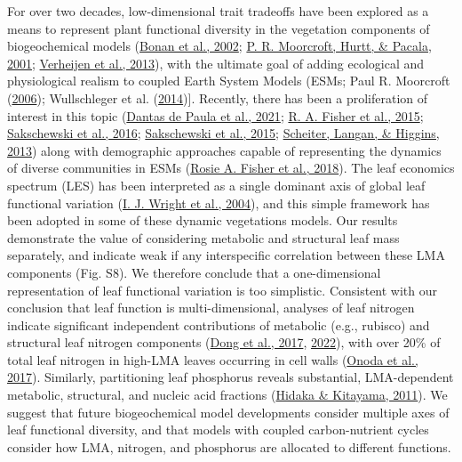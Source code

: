 \documentclass[
  12pt,
  letterpaper,
  DIV=11,
  numbers=noendperiod]{scrartcl}
\begin{document}
For over two decades, low-dimensional trait tradeoffs have been explored
as a means to represent plant functional diversity in the vegetation
components of biogeochemical models
(\protect\hyperlink{ref-Bonan2002}{Bonan et al., 2002};
\protect\hyperlink{ref-Moorcroft2001}{P. R. Moorcroft, Hurtt, \& Pacala,
2001}; \protect\hyperlink{ref-Verheijen2013}{Verheijen et al., 2013}),
with the ultimate goal of adding ecological and physiological realism to
coupled Earth System Models (ESMs; Paul R. Moorcroft
(\protect\hyperlink{ref-Moorcroft2006}{2006}); Wullschleger et al.
(\protect\hyperlink{ref-Wullschleger2014}{2014}){]}. Recently, there has
been a proliferation of interest in this topic
(\protect\hyperlink{ref-DantasdePaula2021}{Dantas de Paula et al.,
2021}; \protect\hyperlink{ref-Fisher2015}{R. A. Fisher et al., 2015};
\protect\hyperlink{ref-Sakschewski2016}{Sakschewski et al., 2016};
\protect\hyperlink{ref-Sakschewski2015}{Sakschewski et al., 2015};
\protect\hyperlink{ref-Scheiter2013}{Scheiter, Langan, \& Higgins,
2013}) along with demographic approaches capable of representing the
dynamics of diverse communities in ESMs
(\protect\hyperlink{ref-Fisher2018}{Rosie A. Fisher et al., 2018}). The
leaf economics spectrum (LES) has been interpreted as a single dominant
axis of global leaf functional variation
(\protect\hyperlink{ref-Wright2004a}{I. J. Wright et al., 2004}), and
this simple framework has been adopted in some of these dynamic
vegetations models. Our results demonstrate the value of considering
metabolic and structural leaf mass separately, and indicate weak if any
interspecific correlation between these LMA components (Fig. S8). We
therefore conclude that a one-dimensional representation of leaf
functional variation is too simplistic. Consistent with our conclusion
that leaf function is multi-dimensional, analyses of leaf nitrogen
indicate significant independent contributions of metabolic (e.g.,
rubisco) and structural leaf nitrogen components
(\protect\hyperlink{ref-Dong2017}{Dong et al., 2017},
\protect\hyperlink{ref-Dong2022a}{2022}), with over 20\% of total leaf
nitrogen in high-LMA leaves occurring in cell walls
(\protect\hyperlink{ref-Onoda2017}{Onoda et al., 2017}). Similarly,
partitioning leaf phosphorus reveals substantial, LMA-dependent
metabolic, structural, and nucleic acid fractions
(\protect\hyperlink{ref-Hidaka2011}{Hidaka \& Kitayama, 2011}). We
suggest that future biogeochemical model developments consider multiple
axes of leaf functional diversity, and that models with coupled
carbon-nutrient cycles consider how LMA, nitrogen, and phosphorus are
allocated to different functions.
\end{document}
